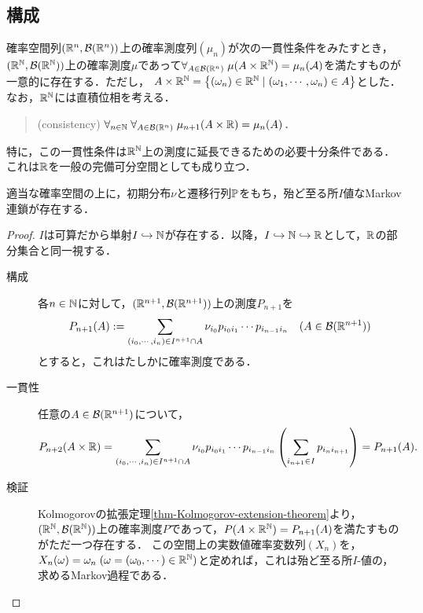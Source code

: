 \documentclass[uplatex,dvipdfmx]{jsreport}
\begin{document}
\subsection{構成}

\begin{theorem}[Kolmogorov]\label{thm-Kolmogorov-extension-theorem}
    確率空間列$(\mathbb{R}^n,\mathcal{B}(\mathbb{R}^n))$上の確率測度列$(\mu_n)$が次の一貫性条件をみたすとき，$(\mathbb{R}^{\mathbb{N}},\mathcal{B}(\mathbb{R}^{\mathbb{N}}))$上の確率測度$\mu$であって$\forall_{A\in\mathcal{B}(\mathbb{R}^n)}\;\mu(A\times\mathbb{R}^{\mathbb{N}})=\mu_n(\mathcal{A})$を満たすものが一意的に存在する．ただし，
    $A\times\mathbb{R}^{\mathbb{N}}=\left\{(\omega_n)\in\mathbb{R}^{\mathbb{N}}\mid (\omega_1,\cdots,\omega_n)\in A\right\}$とした．
    なお，$\mathbb{R}^{\mathbb{N}}$には直積位相を考える．
    \begin{quotation}
        (consistency) $\forall_{n\in\mathbb{N}}\;\forall_{A\in\mathcal{B}(\mathbb{R}^n)}\;\mu_{n+1}(A\times\mathbb{R})=\mu_n(A)$．
    \end{quotation}
    特に，この一貫性条件は$\mathbb{R}^{\mathbb{N}}$上の測度に延長できるための必要十分条件である．
    これは$\mathbb{R}$を一般の完備可分空間としても成り立つ．
\end{theorem}

\begin{proposition}
    適当な確率空間の上に，初期分布$\nu$と遷移行列$\mathbb{P}$をもち，殆ど至る所$I$値なMarkov連鎖が存在する．
\end{proposition}
\begin{proof}
    $I$は可算だから単射$I\hookrightarrow\mathbb{N}$が存在する．以降，$I\hookrightarrow\mathbb{N}\hookrightarrow\mathbb{R}$として，$\mathbb{R}$の部分集合と同一視する．
    \begin{description}
        \item[構成] 各$n\in\mathbb{N}$に対して，$(\mathbb{R}^{n+1},\mathcal{B}(\mathbb{R}^{n+1}))$上の測度$P_{n+1}$を
        \[P_{n+1}(A):=\sum_{(i_0,\cdots,i_n)\in I^{n+1}\cap A}\nu_{i_0}p_{i_0i_1}\cdots p_{i_{n-1}i_n}\quad(A\in\mathcal{B}(\mathbb{R}^{n+1}))\]
        とすると，これはたしかに確率測度である．
        \item[一貫性] 任意の$A\in\mathcal{B}(\mathbb{R}^{n+1})$について，
        \[P_{n+2}(A\times\mathbb{R})=\sum_{(i_0,\cdots,i_n)\in I^{n+1}\cap A}\nu_{i_0}p_{i_0i_1}\cdots p_{i_{n-1}i_n}\left(\sum_{i_{n+1}\in I}p_{i_ni_{n+1}}\right)=P_{n+1}(A).\]
        \item[検証] Kolmogorovの拡張定理\ref{thm-Kolmogorov-extension-theorem}より，$(\mathbb{R}^{\mathbb{N}},\mathcal{B}(\mathbb{R}^{\mathbb{N}}))$上の確率測度$P$であって，$P(A\times\mathbb{R}^{\mathbb{N}})=P_{n+1}(A)$を満たすものがただ一つ存在する．
        この空間上の実数値確率変数列$(X_n)$を，$X_n(\omega)=\omega_n\;(\omega=(\omega_0,\cdots)\in\mathbb{R}^{\mathbb{N}})$と定めれば，これは殆ど至る所$I$-値の，求めるMarkov過程である．
    \end{description}
\end{proof}
\end{document}
